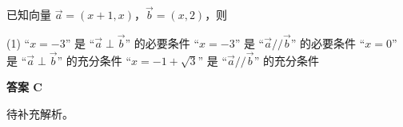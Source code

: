 \begin{choice}[source={2024年高考全国甲卷理科选择题\#9}, topic={向量的垂直与共线}]
已知向量 $\vec{a}=(x+1,x)$，$\vec{b}=(x,2)$，则
\begin{tasks}(1)
	\task ``$x=-3$'' 是 ``$\vec{a}\perp\vec{b}$'' 的必要条件
	\task ``$x=-3$'' 是 ``$\vec{a}//\vec{b}$'' 的必要条件
	\task ``$x=0$'' 是 ``$\vec{a}\perp\vec{b}$'' 的充分条件
	\task ``$x=-1+\sqrt{3}$'' 是 ``$\vec{a}//\vec{b}$'' 的充分条件
\end{tasks}
\end{choice}
\begin{choice-sol}
\textbf{答案 C}

待补充解析。
\end{choice-sol}
